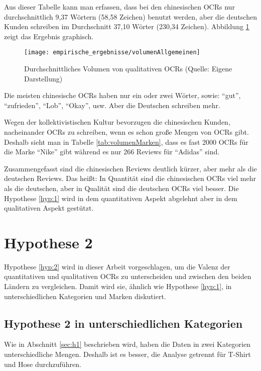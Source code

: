 Aus dieser Tabelle kann man erfassen, dass bei den chinesischen \ac{OCRs} nur durchschnittlich 9,37 Wörtern (58,58 Zeichen) benutzt werden, aber die deutschen Kunden schreiben im Durchschnitt 37,10 Wörter (230,34 Zeichen). Abbildung \ref{fig:volumenAllgemeinen} zeigt das Ergebnis graphisch.
\begin{figure}[htb]
\centering
    \texttt{[image: empirische\_ergebnisse/volumenAllgemeinen]} 
    \caption[Durchschnittliches Volumen von qualitativen OCRs]{Durchschnittliches Volumen von qualitativen \ac{OCRs} (Quelle: Eigene Darstellung)}
    \label{fig:volumenAllgemeinen}
\end{figure}

Die meisten chinesische \ac{OCRs} haben nur ein oder zwei Wörter, sowie: ``gut'', ``zufrieden'', ``Lob'', ``Okay'', \ac{usw}. Aber die Deutschen schreiben mehr. %

Wegen der kollektivistischen Kultur bevorzugen die chinesischen Kunden, nacheinander \ac{OCRs} zu schreiben, wenn es schon große Mengen von \ac{OCRs} gibt. Deshalb sieht man in Tabelle \ref{tab:volumenMarken}, dass es fast 2000 \ac{OCRs} für die Marke ``Nike'' gibt während es nur 266 Reviews für ``Adidas'' sind. 

Zusammengefasst sind die chinesischen Reviews deutlich kürzer, aber mehr als die deutschen Reviews. Das heißt: In Quantität sind die chinesischen \ac{OCRs} viel mehr als die deutschen, aber in Qualität sind die deutschen \ac{OCRs} viel besser. Die Hypothese \ref{hyp:1} wird in dem quantitativen Aspekt abgelehnt aber in dem qualitativen Aspekt gestützt.
\section{Hypothese 2}
Hypothese \ref{hyp:2} wird in dieser Arbeit vorgeschlagen, um die Valenz der quantitativen und qualitativen \ac{OCRs} zu unterscheiden und zwischen den beiden Ländern zu vergleichen. Damit wird sie, ähnlich wie Hypothese \ref{hyp:1}, in unterschiedlichen Kategorien und Marken diskutiert.
\subsection{Hypothese 2 in unterschiedlichen Kategorien}
Wie in Abschnitt \ref{sec:h1} beschrieben wird, haben die Daten in zwei Kategorien unterschiedliche Mengen. Deshalb ist es besser,  die Analyse getrennt für T-Shirt und Hose durchzuführen.

